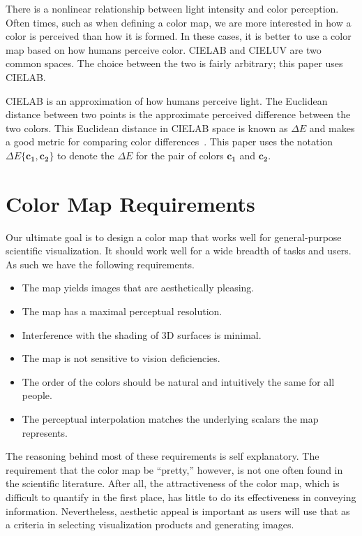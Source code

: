 \documentclass[twocolumn]{article}
\newcommand{\lcite}[1]{~\cite{#1}}
\newcommand{\Lab}{CIELAB\xspace}
\newcommand{\Luv}{CIELUV\xspace}
\newcommand{\DeltaE}{\ensuremath{\Delta{}E}\xspace}
\newcommand*{\cvec}[1]{\mathbf{#1}}
\begin{document}
There is a nonlinear relationship between light intensity and color
perception.  Often times, such as when defining a color map, we are more
interested in how a color is perceived than how it is formed.  In these
cases, it is better to use a color map based on how humans perceive color.
\Lab and \Luv are two common spaces.  The choice between the two is fairly
arbitrary; this paper uses \Lab.

\Lab is an approximation of how humans perceive light.  The Euclidean
distance between two points is the approximate perceived difference between
the two colors.  This Euclidean distance in \Lab space is known as \DeltaE
and makes a good metric for comparing color differences\lcite{Wyszecki82}.
This paper uses the notation $\DeltaE\{\cvec{c_1},\cvec{c_2}\}$ to denote
the \DeltaE for the pair of colors $\cvec{c_1}$ and $\cvec{c_2}$.


\section{Color Map Requirements}
\label{sec:ColorMapRequirements}

Our ultimate goal is to design a color map that works well for
general-purpose scientific visualization.  It should work well for a wide
breadth of tasks and users.  As such we have the following requirements.

\begin{itemize}
\item The map yields images that are aesthetically pleasing.
\item The map has a maximal perceptual resolution.
\item Interference with the shading of 3D surfaces is minimal.
\item The map is not sensitive to vision deficiencies.
\item The order of the colors should be natural and intuitively the same
  for all people.
\item The perceptual interpolation matches the underlying scalars the map
  represents.
\end{itemize}

The reasoning behind most of these requirements is self explanatory.  The
requirement that the color map be ``pretty,'' however, is not one often
found in the scientific literature.  After all, the attractiveness of the
color map, which is difficult to quantify in the first place, has little to
do its effectiveness in conveying information.  Nevertheless, aesthetic
appeal is important as users will use that as a criteria in selecting
visualization products and generating images.
\end{document}
